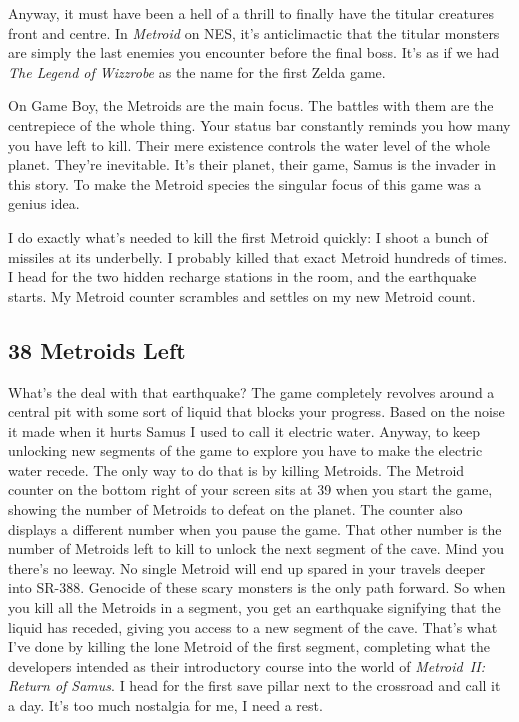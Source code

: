 \documentclass{book}
\begin{document}
Anyway, it must have been a hell of a thrill to finally have the titular creatures front and centre. In \emph{Metroid} on NES, it’s anticlimactic that the titular monsters are simply the last enemies you encounter before the final boss. It’s as if we had \emph{The Legend of Wizzrobe} as the name for the first Zelda game.

On Game Boy, the Metroids are the main focus. The battles with them are the centrepiece of the whole thing. Your status bar constantly reminds you how many you have left to kill. Their mere existence controls the water level of the whole planet. They’re inevitable. It’s their planet, their game, Samus is the invader in this story. To make the Metroid species the singular focus of this game was a genius idea.

I do exactly what’s needed to kill the first Metroid quickly: I shoot a bunch of missiles at its underbelly. I probably killed that exact Metroid hundreds of times. I head for the two hidden recharge stations in the room, and the earthquake starts. My Metroid counter scrambles and settles on my new Metroid count.

\subsection*{38 Metroids Left}\nopagebreak[4]

What’s the deal with that earthquake? The game completely revolves around a central pit with some sort of liquid that blocks your progress. Based on the noise it made when it hurts Samus I used to call it electric water. Anyway, to keep unlocking new segments of the game to explore you have to make the electric water recede. The only way to do that is by killing Metroids. The Metroid counter on the bottom right of your screen sits at 39 when you start the game, showing the number of Metroids to defeat on the planet. The counter also displays a different number when you pause the game. That other number is the number of Metroids left to kill to unlock the next segment of the cave. Mind you there’s no leeway. No single Metroid will end up spared in your travels deeper into SR-388. Genocide of these scary monsters is the only path forward. So when you kill all the Metroids in a segment, you get an earthquake signifying that the liquid has receded, giving you access to a new segment of the cave. That’s what I’ve done by killing the lone Metroid of the first segment, completing what the developers intended as their introductory course into the world of \emph{Metroid~II: Return of Samus}. I head for the first save pillar next to the crossroad and call it a day. It’s too much nostalgia for me, I need a rest.
\end{document}
